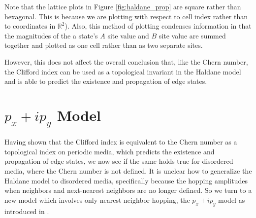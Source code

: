 \documentclass[a4paper]{article}
\begin{document}
Note that the lattice plots in Figure \ref{fig:haldane_prop} are square rather than hexagonal.
This is because we are plotting with respect to cell index rather than to coordinates in $\mathbb{R}^2$).
Also, this method of plotting condenses information in that the magnitudes of the a state's $A$ site value and $B$ site value are summed together and plotted as one cell rather than as two separate sites.

However, this does not affect the overall conclusion that, like the Chern number, the Clifford index can be used as a topological invariant in the Haldane model and is able to predict the existence and propagation of edge states.

\section{\texorpdfstring{$p_x + ip_y$}{px + ipy} Model} 
Having shown that the Clifford index is equivalent to the Chern number as a topological index on periodic media, which predicts the existence and propagation of edge states, we now see if the same holds true for disordered media, where the Chern number is not defined.
It is unclear how to generalize the Haldane model to disordered media, specifically because the hopping amplitudes when neighbors and next-nearest neighbors are no longer defined.
So we turn to a new model which involves only nearest neighbor hopping, the $p_x + ip_y$ model as introduced in \cite{fulga2016aperiodic}.
\end{document}
